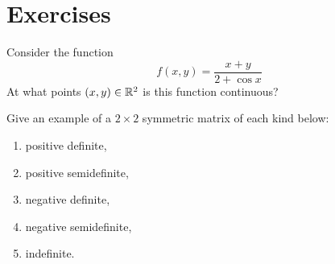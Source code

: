 

\section*{Exercises}
\begin{problem}[Basic]
Consider the function
\begin{equation*}
f(x,y) = \dfrac{x+y}{2+\cos x}
\end{equation*}
At what points $(x,y) \in \mathbb{R}^2$ is this function continuous?
\end{problem}

\begin{problem}[Intermediate]
Give an example of a $2 \times 2$ symmetric matrix of each kind below:
\begin{enumerate}
	\item positive definite, 
	\item positive semidefinite, 
	\item negative definite, 
	\item negative semidefinite,
	\item indefinite.
\end{enumerate}
\end{problem}


